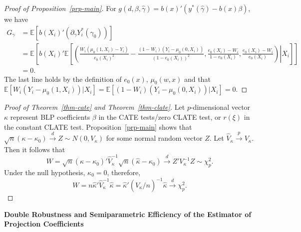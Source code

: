 \documentclass[
  12pt,
  12pt]{article}
\numberwithin{equation}{section}
\theoremstyle{definition}
\theoremstyle{plain}
\theoremstyle{plain}
\theoremstyle{remark}
\begin{document}
\begin{proof}[Proof of Proposition~\ref{prp-main}]
For \(g(d, \beta, \hat\gamma) = b(x)'(y^*(\hat\gamma) - b(x)\beta)\), we
have \[\begin{aligned}
G_\gamma &= \mathbb{E}[b(X_i)'(\partial_\gamma Y_i^*(\gamma_0))] \\
&= \mathbb{E}\left[b(X_i)'\mathbb{E}\left[\left(\left. \frac{W_i(\mu_0(1, X_i) - Y_i)}{e_0(X_i)^2} - \frac{(1 - W_i)(Y_i - \mu_0(0, X_i))}{(1 - e_0(X_i))^2}, \frac{e_0(X_i) - W_i}{1 - e_0(X_i)}, \frac{e_0(X_i) - W_i}{e_0(X_i)}\right) \right\vert X_i\right]\right] \\ 
&= 0.
\end{aligned}\] The last line holds by the definition of \(e_0(x)\),
\(\mu_0(w, x)\) and that
\(\mathbb{E}[W_i(Y_i - \mu_0(1, X_i))\vert X_i] = \mathbb{E}[(1 - W_i)(Y_i - \mu_0(0, X_i))\vert X_i] = 0\).
\end{proof}

\begin{proof}[Proof of Theorem~\ref{thm-cate} and
Theorem~\ref{thm-clate}]
Let \(p\)-dimensional vector \(\kappa\) represent BLP coefficients
\(\beta\) in the CATE tests/zero CLATE test, or \(r(\xi)\) in the
constant CLATE test. Proposition~\ref{prp-main} shows that
\(\sqrt{n}(\kappa - \kappa_0) \xrightarrow{d} Z \sim N(0, V_\kappa)\)
for some normal random vector \(Z\). Let
\(\hat{V}_\kappa \xrightarrow{p} V_\kappa\). Then it follows that \[
W = \sqrt{n}(\hat\kappa - \kappa_0)'\hat{V}_\kappa^{-1}\sqrt{n}(\hat\kappa - \kappa_0) \xrightarrow{d} Z'V_\kappa^{-1}Z \sim \chi^2_{p}.
\] Under the null hypothesis, \(\kappa_0 = 0\), therefore, \[
W = n\hat\kappa'\hat{V}_\kappa^{-1}\hat\kappa = \hat\kappa'(\hat{V}_\kappa / n)^{-1}\hat\kappa \xrightarrow{d} \chi^2_{p}.
\]
\end{proof}

\textbf{Double Robustness and Semiparametric Efficiency of the Estimator
of Projection Coefficients}
\end{document}
